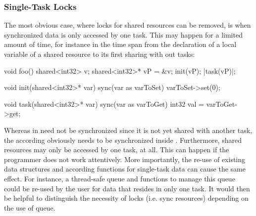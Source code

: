 \subsubsection{Single-Task Locks}
The most obvious case, where locks for shared resources can be removed, is when synchronized data is only accessed by one task. This may happen for a limited amount of time, for instance in the time span from the declaration of a local variable of a shared resource to its first sharing with out tasks:
\begin{ccode}
void foo() {
  shared<int32> v;
  shared<int32>* vP = &v;
  init(vP);
  |task(vP)|;
}

void init(shared<int32>* var) {
  sync(var as varToSet) {
    varToSet->set(0);
  }
}

void task(shared<int32>* var) {
  sync(var as varToGet) {
    int32 val = varToGet->get;
  }
}
\end{ccode}
Whereas  in  need not be synchronized since it is not yet shared with another task, the according  obviously needs to be synchronized inside .
Furthermore, shared resources may only be accessed by one task, at all. This can happen if the programmer does not work attentively. More importantly, the re-use of existing data structures and according functions for single-task data can cause the same effect. For instance, a thread-safe queue and functions to manage this queue could be re-used by the user for data that resides in only one task. It would then be helpful to distinguish the necessity of locks (i.e. sync resources) depending on the use of queue.

